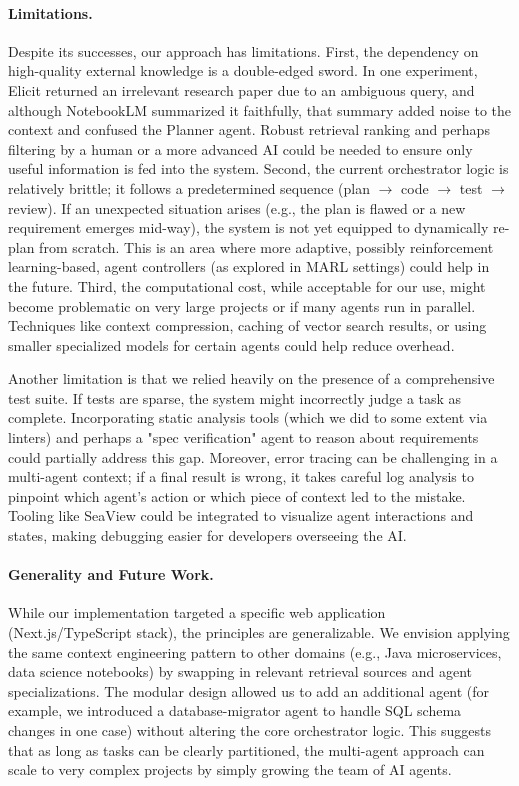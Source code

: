\documentclass[11pt]{article}
\begin{document}
\paragraph{Limitations.} Despite its successes, our approach has limitations. First, the dependency on high-quality external knowledge is a double-edged sword. In one experiment, Elicit returned an irrelevant research paper due to an ambiguous query, and although NotebookLM summarized it faithfully, that summary added noise to the context and confused the Planner agent. Robust retrieval ranking and perhaps filtering by a human or a more advanced AI could be needed to ensure only useful information is fed into the system. Second, the current orchestrator logic is relatively brittle; it follows a predetermined sequence (plan $\to$ code $\to$ test $\to$ review). If an unexpected situation arises (e.g., the plan is flawed or a new requirement emerges mid-way), the system is not yet equipped to dynamically re-plan from scratch. This is an area where more adaptive, possibly reinforcement learning-based, agent controllers (as explored in MARL settings) could help in the future. Third, the computational cost, while acceptable for our use, might become problematic on very large projects or if many agents run in parallel. Techniques like context compression, caching of vector search results, or using smaller specialized models for certain agents could help reduce overhead.

Another limitation is that we relied heavily on the presence of a comprehensive test suite. If tests are sparse, the system might incorrectly judge a task as complete. Incorporating static analysis tools (which we did to some extent via linters) and perhaps a "spec verification" agent to reason about requirements could partially address this gap. Moreover, error tracing can be challenging in a multi-agent context; if a final result is wrong, it takes careful log analysis to pinpoint which agent's action or which piece of context led to the mistake. Tooling like SeaView \cite{seaview2025} could be integrated to visualize agent interactions and states, making debugging easier for developers overseeing the AI.

\paragraph{Generality and Future Work.} While our implementation targeted a specific web application (Next.js/TypeScript stack), the principles are generalizable. We envision applying the same context engineering pattern to other domains (e.g., Java microservices, data science notebooks) by swapping in relevant retrieval sources and agent specializations. The modular design allowed us to add an additional agent (for example, we introduced a database-migrator agent to handle SQL schema changes in one case) without altering the core orchestrator logic. This suggests that as long as tasks can be clearly partitioned, the multi-agent approach can scale to very complex projects by simply growing the team of AI agents.
\end{document}
